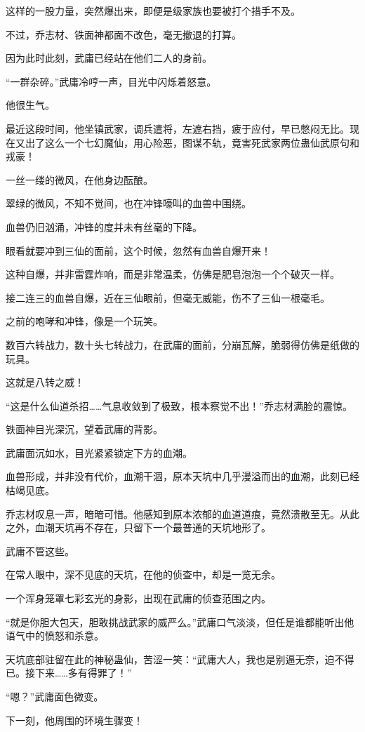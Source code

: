 \begin{this_body}
这样的一股力量，突然爆出来，即便是级家族也要被打个措手不及。

不过，乔志材、铁面神都面不改色，毫无撤退的打算。

因为此时此刻，武庸已经站在他们二人的身前。

“一群杂碎。”武庸冷哼一声，目光中闪烁着怒意。

他很生气。

最近这段时间，他坐镇武家，调兵遣将，左遮右挡，疲于应付，早已憋闷无比。现在又出了这么一个七幻魔仙，用心险恶，图谋不轨，竟害死武家两位蛊仙武原句和戎豪！

一丝一缕的微风，在他身边酝酿。

翠绿的微风，不知不觉间，也在冲锋嚎叫的血兽中围绕。

血兽仍旧汹涌，冲锋的度并未有丝毫的下降。

眼看就要冲到三仙的面前，这个时候，忽然有血兽自爆开来！

这种自爆，并非雷霆炸响，而是非常温柔，仿佛是肥皂泡泡一个个破灭一样。

接二连三的血兽自爆，近在三仙眼前，但毫无威能，伤不了三仙一根毫毛。

之前的咆哮和冲锋，像是一个玩笑。

数百六转战力，数十头七转战力，在武庸的面前，分崩瓦解，脆弱得仿佛是纸做的玩具。

这就是八转之威！

“这是什么仙道杀招……气息收敛到了极致，根本察觉不出！”乔志材满脸的震惊。

铁面神目光深沉，望着武庸的背影。

武庸面沉如水，目光紧紧锁定下方的血潮。

血兽形成，并非没有代价，血潮干涸，原本天坑中几乎漫溢而出的血潮，此刻已经枯竭见底。

乔志材叹息一声，暗暗可惜。他感知到原本浓郁的血道道痕，竟然溃散至无。从此之外，血潮天坑再不存在，只留下一个最普通的天坑地形了。

武庸不管这些。

在常人眼中，深不见底的天坑，在他的侦查中，却是一览无余。

一个浑身笼罩七彩玄光的身影，出现在武庸的侦查范围之内。

“就是你胆大包天，胆敢挑战武家的威严么。”武庸口气淡淡，但任是谁都能听出他语气中的愤怒和杀意。

天坑底部驻留在此的神秘蛊仙，苦涩一笑：“武庸大人，我也是别逼无奈，迫不得已。接下来……多有得罪了！”

“嗯？”武庸面色微变。

下一刻，他周围的环境生骤变！


\end{this_body}
